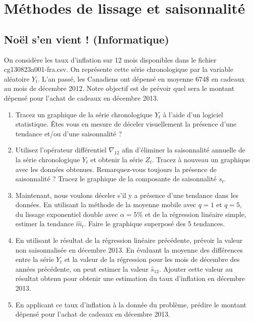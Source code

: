 \documentclass[11pt,english,francais]{article}
\begin{document}
\section{Méthodes de lissage et saisonnalité}
\label{sec:serie-dexercices-1}

\subsection{Noël s'en vient ! (Informatique)}
\label{sec:exercice-1-1}

On considère les taux d'inflation sur 12 mois disponibles dans le
fichier cg130823a001-fra.csv. On représente cette série chronologique
par la variable aléatoire $Y_t$. L'an passé, les Canadiens ont dépensé
en moyenne $674\$$ en cadeaux au mois de décembre 2012. Notre objectif
est de prévoir quel sera le montant dépensé pour l'achat de cadeaux en
décembre 2013.

\begin{enumerate}
\item Tracez un graphique de la série chronologique $Y_t$ à l'aide
  d'un logiciel statistique. Êtes vous en mesure de déceler
  visuellement la présence d'une tendance et/ou d'une saisonnalité ?

\item Utilisez l'opérateur différentiel $\nabla_{12}$ afin d'éliminer
  la saisonnalité annuelle de la série chronologique $Y_t$ et obtenir
  la série $Z_t$. Tracez à nouveau un graphique avec les données
  obtenues. Remarquez-vous toujours la présence de saisonnalité ?
  Tracez le graphique de la composante de saisonnalité $s_t$.

\item Maintenant, nous voulons déceler s'il y a présence d'une
  tendance dans les données. En utilisant la méthode de la moyenne
  mobile avec $q=1$ et $q=5$, du lissage exponentiel double avec
  $\alpha=5\%$ et de la régression linéaire simple, estimer la
  tendance $\hat{m}_t$. Faire le graphique superposé des 5 tendances.

\item En utilisant le résultat de la régression linéaire précédente,
  prévoir la valeur non saisonnalisée en décembre 2013. En évaluant la
  moyenne des différences entre la série $Y_t$ et la valeur de la
  régression pour les mois de décembre des années précédente, on peut
  estimer la valeur $\hat{s}_{12}$. Ajouter cette valeur au résultat
  obtenu pour obtenir une estimation du taux d'inflation en décembre
  2013.

\item En applicant ce taux d'inflation à la donnée du problème,
  prédire le montant dépensé pour l'achat de cadeaux en décembre 2013.
\end{enumerate}
\end{document}
